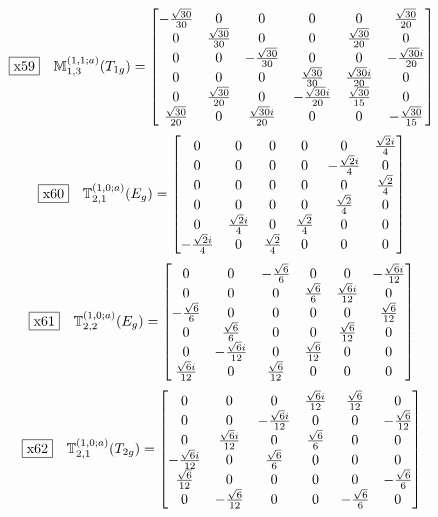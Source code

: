 \documentclass[fleqn,10pt,landscape]{jsarticle}
\begin{document}
\begin{dmath*}
\fbox{x59}\quad \mathbb{M}_{1,3}^{(1,1;a)}(T_{1g})=\begin{bmatrix} - \frac{\sqrt{30}}{30} & 0 & 0 & 0 & 0 & \frac{\sqrt{30}}{20} \\ 0 & \frac{\sqrt{30}}{30} & 0 & 0 & \frac{\sqrt{30}}{20} & 0 \\ 0 & 0 & - \frac{\sqrt{30}}{30} & 0 & 0 & - \frac{\sqrt{30} i}{20} \\ 0 & 0 & 0 & \frac{\sqrt{30}}{30} & \frac{\sqrt{30} i}{20} & 0 \\ 0 & \frac{\sqrt{30}}{20} & 0 & - \frac{\sqrt{30} i}{20} & \frac{\sqrt{30}}{15} & 0 \\ \frac{\sqrt{30}}{20} & 0 & \frac{\sqrt{30} i}{20} & 0 & 0 & - \frac{\sqrt{30}}{15} \end{bmatrix}
\end{dmath*}
\begin{dmath*}
\fbox{x60}\quad \mathbb{T}_{2,1}^{(1,0;a)}(E_{g})=\begin{bmatrix} 0 & 0 & 0 & 0 & 0 & \frac{\sqrt{2} i}{4} \\ 0 & 0 & 0 & 0 & - \frac{\sqrt{2} i}{4} & 0 \\ 0 & 0 & 0 & 0 & 0 & \frac{\sqrt{2}}{4} \\ 0 & 0 & 0 & 0 & \frac{\sqrt{2}}{4} & 0 \\ 0 & \frac{\sqrt{2} i}{4} & 0 & \frac{\sqrt{2}}{4} & 0 & 0 \\ - \frac{\sqrt{2} i}{4} & 0 & \frac{\sqrt{2}}{4} & 0 & 0 & 0 \end{bmatrix}
\end{dmath*}
\begin{dmath*}
\fbox{x61}\quad \mathbb{T}_{2,2}^{(1,0;a)}(E_{g})=\begin{bmatrix} 0 & 0 & - \frac{\sqrt{6}}{6} & 0 & 0 & - \frac{\sqrt{6} i}{12} \\ 0 & 0 & 0 & \frac{\sqrt{6}}{6} & \frac{\sqrt{6} i}{12} & 0 \\ - \frac{\sqrt{6}}{6} & 0 & 0 & 0 & 0 & \frac{\sqrt{6}}{12} \\ 0 & \frac{\sqrt{6}}{6} & 0 & 0 & \frac{\sqrt{6}}{12} & 0 \\ 0 & - \frac{\sqrt{6} i}{12} & 0 & \frac{\sqrt{6}}{12} & 0 & 0 \\ \frac{\sqrt{6} i}{12} & 0 & \frac{\sqrt{6}}{12} & 0 & 0 & 0 \end{bmatrix}
\end{dmath*}
\begin{dmath*}
\fbox{x62}\quad \mathbb{T}_{2,1}^{(1,0;a)}(T_{2g})=\begin{bmatrix} 0 & 0 & 0 & \frac{\sqrt{6} i}{12} & \frac{\sqrt{6}}{12} & 0 \\ 0 & 0 & - \frac{\sqrt{6} i}{12} & 0 & 0 & - \frac{\sqrt{6}}{12} \\ 0 & \frac{\sqrt{6} i}{12} & 0 & \frac{\sqrt{6}}{6} & 0 & 0 \\ - \frac{\sqrt{6} i}{12} & 0 & \frac{\sqrt{6}}{6} & 0 & 0 & 0 \\ \frac{\sqrt{6}}{12} & 0 & 0 & 0 & 0 & - \frac{\sqrt{6}}{6} \\ 0 & - \frac{\sqrt{6}}{12} & 0 & 0 & - \frac{\sqrt{6}}{6} & 0 \end{bmatrix}
\end{dmath*}
\end{document}
